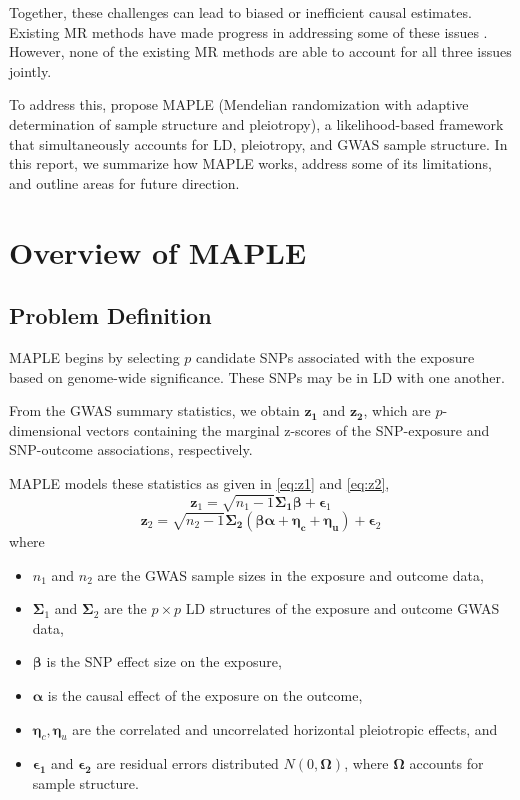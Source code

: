 \documentclass[12pt]{article}
\begin{document}
Together, these challenges can lead to biased or inefficient causal estimates. Existing MR methods have made progress in addressing some of these issues \citep{Zhang2025}. However, none of the existing MR methods are able to account for all three issues jointly. 

To address this, \citet{Zhang2025} propose MAPLE (Mendelian randomization with adaptive determination of sample structure and pleiotropy), a likelihood-based framework that simultaneously accounts for LD, pleiotropy, and GWAS sample structure. In this report, we summarize how MAPLE works, address some of its limitations, and outline areas for future direction. 

\section{Overview of MAPLE \citep{Zhang2025}}\label{sec:maple}

\subsection{Problem Definition}

MAPLE begins by selecting $p$ candidate SNPs associated with the exposure based on genome-wide significance. These SNPs may be in LD with one another.

From the GWAS summary statistics, we obtain $\mathbf{z_1}$ and $\mathbf{z_2}$, which are $p$-dimensional vectors containing the marginal z-scores of the SNP-exposure and SNP-outcome associations, respectively.

MAPLE models these statistics as given in \cref{eq:z1} and \cref{eq:z2},
\[\label{eq:z1}
\mathbf z_1 = \sqrt{n_1-1} \boldsymbol{\Sigma_1 \beta}+\boldsymbol \epsilon_1\]
\[\label{eq:z2}
\mathbf z_2 = \sqrt{n_2-1}\boldsymbol{\Sigma_2}(\boldsymbol{\beta\alpha}+\boldsymbol{ \eta_c }+ \boldsymbol{\eta_u} )+\boldsymbol\epsilon_2\]
where 
\begin{itemize}
    \item $n_1$ and $n_2$ are the GWAS sample sizes in the exposure and outcome data,
    \item $\boldsymbol\Sigma_1$ and $\boldsymbol\Sigma_2$ are the $p\times p$ LD structures of the exposure and outcome GWAS data,
    \item $\boldsymbol \beta$  is the SNP effect size on the exposure,
    \item $\boldsymbol \alpha$ is the causal effect of the exposure on the outcome,
    \item $\boldsymbol\eta_c, \boldsymbol \eta_u$ are the correlated and uncorrelated horizontal pleiotropic effects, and
    \item $\boldsymbol{\epsilon_1}$ and $\boldsymbol{\epsilon_2}$ are residual errors distributed $N(0, \boldsymbol{\Omega})$, where $\boldsymbol{\Omega}$ accounts for sample structure.
\end{itemize}
\end{document}
